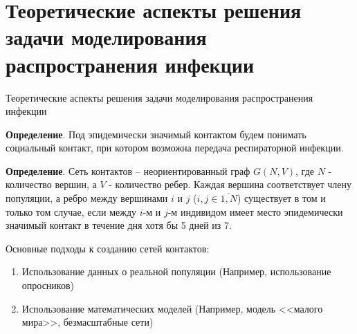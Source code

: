 \documentclass[10pt, unicode, xcolor={svgnames, table, hyperref}]{beamer}
\begin{document}
\section{Теоретические аспекты решения задачи моделирования распространения инфекции}
\begin{frame}[fragile,t]{Теоретические аспекты решения задачи моделирования распространения инфекции}
	
	\begin{defin}
		\textbf{Определение}.
		Под эпидемически значимый контактом будем понимать социальный контакт, при котором возможна передача респираторной инфекции.
	\end{defin}	

	\begin{defin}
		\textbf{Определение}.
		Сеть контактов -- неориентированный граф $G(N, V)$, где $N$ - количество вершин, а $V$ - количество ребер. Каждая вершина соответствует члену популяции, а ребро между вершинами $i$ и $j$ ($i,j \in \overline{1, N}$) существует в том и только том случае, если между $i$-м и $j$-м индивидом имеет место эпидемически значимый контакт в течение дня хотя бы 5 дней из 7.
	\end{defin}	

	Основные подходы к созданию сетей контактов:
	\begin{enumerate}
		\item  Использование данных о реальной популяции (Например, использование опросников)
		\item  Использование математических моделей (Например, модель <<малого мира>>, безмасштабные сети)
	\end{enumerate}

\end{frame}
\end{document}
